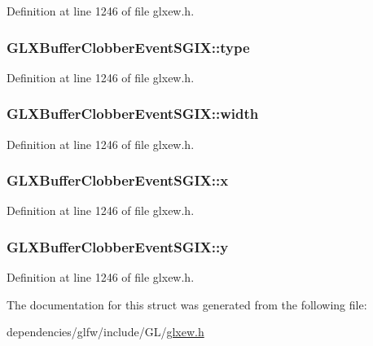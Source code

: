 Definition at line 1246 of file glxew.\-h.

\hypertarget{struct_g_l_x_buffer_clobber_event_s_g_i_x_a36e3e8a5feea664623ea43d0f273b63a}{
\subsubsection[{type}]{ G\-L\-X\-Buffer\-Clobber\-Event\-S\-G\-I\-X\-::type}}\label{struct_g_l_x_buffer_clobber_event_s_g_i_x_a36e3e8a5feea664623ea43d0f273b63a}


Definition at line 1246 of file glxew.\-h.

\hypertarget{struct_g_l_x_buffer_clobber_event_s_g_i_x_adad23535733161528427584a42bfc6eb}{
\subsubsection[{width}]{ G\-L\-X\-Buffer\-Clobber\-Event\-S\-G\-I\-X\-::width}}\label{struct_g_l_x_buffer_clobber_event_s_g_i_x_adad23535733161528427584a42bfc6eb}


Definition at line 1246 of file glxew.\-h.

\hypertarget{struct_g_l_x_buffer_clobber_event_s_g_i_x_a5118d48c3c8d5253d39922b5014b52ff}{
\subsubsection[{x}]{ G\-L\-X\-Buffer\-Clobber\-Event\-S\-G\-I\-X\-::x}}\label{struct_g_l_x_buffer_clobber_event_s_g_i_x_a5118d48c3c8d5253d39922b5014b52ff}


Definition at line 1246 of file glxew.\-h.

\hypertarget{struct_g_l_x_buffer_clobber_event_s_g_i_x_aef21efa11558a5b67861f96471c56003}{
\subsubsection[{y}]{ G\-L\-X\-Buffer\-Clobber\-Event\-S\-G\-I\-X\-::y}}\label{struct_g_l_x_buffer_clobber_event_s_g_i_x_aef21efa11558a5b67861f96471c56003}


Definition at line 1246 of file glxew.\-h.



The documentation for this struct was generated from the following file\-:\begin{DoxyCompactItemize}
\item 
dependencies/glfw/include/\-G\-L/\hyperlink{glxew_8h}{glxew.\-h}\end{DoxyCompactItemize}
